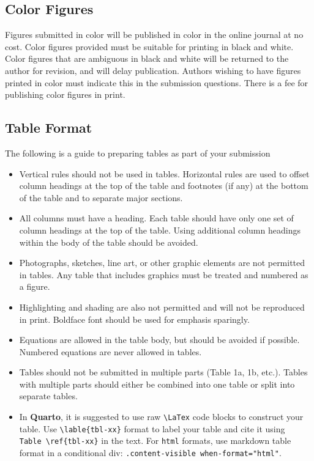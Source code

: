 \documentclass[Journal,LineNumbers]{ascelike-new}
\begin{document}
\subsection{Color Figures}\label{color-figures}

Figures submitted in color will be published in color in the online
journal at no cost. Color figures provided must be suitable for printing
in black and white. Color figures that are ambiguous in black and white
will be returned to the author for revision, and will delay publication.
Authors wishing to have figures printed in color must indicate this in
the submission questions. There is a fee for publishing color figures in
print.

\subsection{Table Format}\label{table-format}

The following is a guide to preparing tables as part of your submission

\begin{itemize}
\item
  Vertical rules should not be used in tables. Horizontal rules are used
  to offset column headings at the top of the table and footnotes (if
  any) at the bottom of the table and to separate major sections.
\item
  All columns must have a heading. Each table should have only one set
  of column headings at the top of the table. Using additional column
  headings within the body of the table should be avoided.
\item
  Photographs, sketches, line art, or other graphic elements are not
  permitted in tables. Any table that includes graphics must be treated
  and numbered as a figure.
\item
  Highlighting and shading are also not permitted and will not be
  reproduced in print. Boldface font should be used for emphasis
  sparingly.
\item
  Equations are allowed in the table body, but should be avoided if
  possible. Numbered equations are never allowed in tables.
\item
  Tables should not be submitted in multiple parts (Table 1a, 1b, etc.).
  Tables with multiple parts should either be combined into one table or
  split into separate tables.
\item
  In \textbf{Quarto}, it is suggested to use raw
  \texttt{\textbackslash{}LaTex} code blocks to construct your table.
  Use \texttt{\textbackslash{}lable\{tbl-xx\}} format to label your
  table and cite it using \texttt{Table\ \textbackslash{}ref\{tbl-xx\}}
  in the text. For \texttt{html} formats, use markdown table format in a
  conditional div: \texttt{.content-visible\ when-format="html"}.
\end{itemize}
\end{document}
